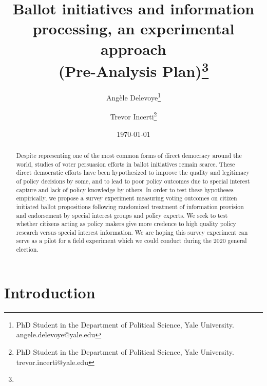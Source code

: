 \documentclass[12pt,final,fleqn]{article}
\theoremstyle{plain}
\begin{document}
\singlespace
\title{\textbf{Ballot initiatives and information processing, an experimental approach \\
(Pre-Analysis Plan)}\vspace{-1ex}\thanks{}}
\author{Angèle Delevoye\thanks{PhD Student in the Department of Political Science, Yale University. angele.delevoye@yale.edu}\vspace{-1ex}}
\author{Trevor Incerti\thanks{PhD Student in the Department of Political Science, Yale University. trevor.incerti@yale.edu}\vspace{-1ex}}
\affil{\textit{}\vspace{-2.5ex}}
\date{\today}
\maketitle

\begin{abstract}
\noindent
Despite representing one of the most common forms of direct democracy around the world, studies of voter persuasion efforts in ballot initiatives remain scarce. These direct democratic efforts have been hypothesized to improve the quality and legitimacy of policy decisions by some, and to lead to poor policy outcomes due to special interest capture and lack of policy knowledge by others. In order to test these hypotheses empirically, we propose a survey experiment measuring voting outcomes on citizen initiated ballot propositions following randomized treatment of information provision and endorsement by special interest groups and policy experts. We seek to test whether citizens acting as policy makers give more credence to high quality policy research versus special interest information. We are hoping this survey experiment can serve as a pilot for a field experiment which we could conduct during the 2020 general election.
\vspace{6cm}
\end{abstract}

\pagebreak

\doublespace


\section{Introduction} \label{sec:Introduction}
\end{document}

